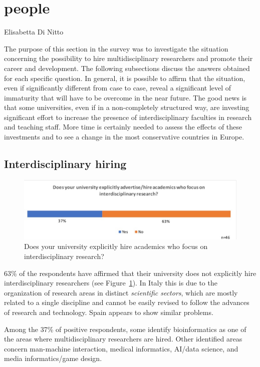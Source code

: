 \newpage
\section{people}

Elisabetta Di Nitto

The purpose of this section in the survey was to investigate the
situation concerning the possibility to hire multidisciplinary
researchers and promote their career and development. The 
following subsections discuss the answers obtained for each specific
question. In general, it is possible to affirm that the situation,
even if significantly different from case to case, reveal a
significant level of immaturity that will have to be overcome in the
near future. The good news is that some universities, even if in
a non-completely structured way, are investing significant effort to
increase the presence of interdisciplinary faculties in research and
teaching staff. More time is certainly needed to assess the
effects of these investments and to see a change in the most
conservative countries in Europe. 

\subsection{Interdisciplinary hiring}\label{sec:hiring}

\begin{figure}[h]
\centering
\includegraphics[width = \linewidth]{charts/3a.jpg}
\caption{Does your university explicitly hire academics
  who focus on interdisciplinary research?}
\label{sect3:hirings}
\end{figure}

63\% of the respondents have affirmed that their university does not
explicitly hire interdisciplinary researchers (see Figure~\ref{sect3:hirings}). In Italy this is 
due to the organization of research areas in distinct \emph{scientific
  sectors}, which are mostly related to a single discipline and cannot be easily revised to follow the advances of
research and technology. Spain appears to show similar problems.

Among the 37\% of positive respondents, some identify bioinformatics
as one of the areas where multidisciplinary researchers are hired. 
Other identified areas concern man-machine interaction, medical
informatics, AI/data science, and media informatics/game design.

